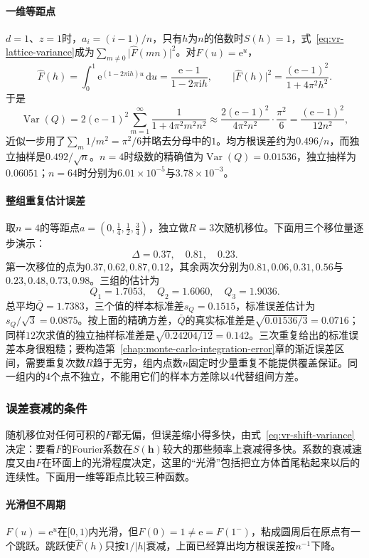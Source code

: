 \paragraph{一维等距点}
$d=1$、$z=1$时，$a_i=(i-1)/n$，只有$h$为$n$的倍数时$S(h)=1$，式~\eqref{eq:vr-lattice-variance}成为$\sum_{m\neq0}\lvert\hat{F}(mn)\rvert^2$。对$F(u)=\mathrm{e}^{u}$，
\[
 \hat{F}(h)=\int_0^1\mathrm{e}^{(1-2\pi\mathrm{i}h)u}\,\mathrm{d}u=\frac{\mathrm{e}-1}{1-2\pi\mathrm{i}h},\qquad \bigl\lvert\hat{F}(h)\bigr\rvert^2=\frac{(\mathrm{e}-1)^2}{1+4\pi^2h^2} .
\]
于是
\[
 \operatorname{Var}(Q)=2(\mathrm{e}-1)^2\sum_{m=1}^{\infty}\frac{1}{1+4\pi^2m^2n^2}\approx\frac{2(\mathrm{e}-1)^2}{4\pi^2n^2}\cdot\frac{\pi^2}{6}=\frac{(\mathrm{e}-1)^2}{12n^2} ,
\]
近似一步用了$\sum_m1/m^2=\pi^2/6$并略去分母中的$1$。均方根误差约为$0.496/n$，而独立抽样是$0.492/\sqrt{n}$。$n=4$时级数的精确值为$\operatorname{Var}(Q)=0.01536$，独立抽样为$0.06051$；$n=64$时分别为$6.01\times10^{-5}$与$3.78\times10^{-3}$。

\paragraph{整组重复估计误差}
取$n=4$的等距点$a=(0,\tfrac14,\tfrac12,\tfrac34)$，独立做$R=3$次随机移位。下面用三个移位量逐步演示：
\[
 \Delta=0.37,\quad 0.81,\quad 0.23 .
\]
第一次移位的点为$0.37,0.62,0.87,0.12$，其余两次分别为$0.81,0.06,0.31,0.56$与$0.23,0.48,0.73,0.98$。三组的估计为
\[
 Q_1=1.7053,\quad Q_2=1.6060,\quad Q_3=1.9036 .
\]
总平均$\bar{Q}=1.7383$，三个值的样本标准差$s_Q=0.1515$，标准误差估计为$s_Q/\sqrt3=0.0875$。按上面的精确方差，$\bar{Q}$的真实标准差是$\sqrt{0.01536/3}=0.0716$；同样$12$次求值的独立抽样标准差是$\sqrt{0.24204/12}=0.142$。三次重复给出的标准误差本身很粗糙；要构造第~\ref{chap:monte-carlo-integration-error}章的渐近误差区间，需要重复次数$R$趋于无穷，组内点数$n$固定时少量重复不能提供覆盖保证。同一组内的$4$个点不独立，不能用它们的样本方差除以$4$代替组间方差。

\subsubsection{误差衰减的条件}
\label{sec:vr-rqmc-rates}

随机移位对任何可积的$F$都无偏，但误差缩小得多快，由式~\eqref{eq:vr-shift-variance}决定：要看$F$的Fourier系数在$S(\bm{h})$较大的那些频率上衰减得多快。系数的衰减速度又由$F$在环面上的光滑程度决定，这里的“光滑”包括把立方体首尾粘起来以后的连续性。下面用一维等距点比较三种函数。

\paragraph{光滑但不周期}
$F(u)=\mathrm{e}^{u}$在$[0,1)$内光滑，但$F(0)=1\neq\mathrm{e}=F(1^{-})$，粘成圆周后在原点有一个跳跃。跳跃使$\hat{F}(h)$只按$1/\lvert h\rvert$衰减，上面已经算出均方根误差按$n^{-1}$下降。

